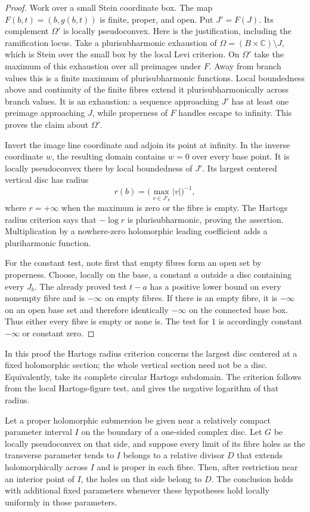 \begin{proof}
Work over a small Stein coordinate box. The map
$F(b,t)=(b,g(b,t))$ is finite, proper, and open. Put $J'=F(J)$.
Its complement $\Omega'$ is locally pseudoconvex. Here is the
justification, including the ramification locus. Take a
plurisubharmonic exhaustion of
$\Omega=(B\times\mathbb C)\setminus J$, which is Stein over the
small box by the local Levi criterion. On $\Omega'$ take the maximum
of this exhaustion over all preimages under $F$. Away from branch
values this is a finite maximum of plurisubharmonic functions.
Local boundedness above and continuity of the finite fibres extend
it plurisubharmonically across branch values. It is an exhaustion:
a sequence approaching $J'$ has at least one preimage approaching
$J$, while properness of $F$ handles escape to infinity. This proves
the claim about $\Omega'$.

Invert the image line coordinate and adjoin its point at infinity.
In the inverse coordinate $w$, the resulting domain contains
$w=0$ over every base point. It is locally pseudoconvex there by
local boundedness of $J'$. Its largest centered vertical disc has
radius
\[
 r(b)=\bigl(\max_{v\in J'_b}|v|\bigr)^{-1},
\]
where $r=+\infty$ when the maximum is zero or the fibre is empty.
The Hartogs radius criterion says that $-\log r$ is
plurisubharmonic, proving the assertion. Multiplication by a
nowhere-zero holomorphic leading coefficient adds a pluriharmonic
function.

For the constant test, note first that empty fibres form an open
set by properness. Choose, locally on the base, a constant $a$ outside
a disc containing every $J_b$. The already proved test $t-a$ has
a positive lower bound on every nonempty fibre and is $-\infty$
on empty fibres. If there is an empty fibre, it is $-\infty$ on an
open base set and therefore identically $-\infty$ on the connected
base box. Thus either every fibre is empty or none is. The test
for $1$ is accordingly constant $-\infty$ or constant zero.
\end{proof}

In this proof the Hartogs radius criterion concerns the largest
disc centered at a fixed holomorphic section; the whole vertical
section need not be a disc. Equivalently, take its complete circular
Hartogs subdomain. The criterion follows from the local
Hartogs-figure test, and gives the negative logarithm of that radius.

\begin{lemma}\label{holes:boundary-trapping}
Let a proper holomorphic submersion be given near a relatively compact
parameter interval $I$ on the boundary of a one-sided complex disc.
Let $G$ be locally pseudoconvex on that side, and suppose every
limit of its fibre holes as the transverse parameter tends to $I$
belongs to a relative divisor $D$ that extends holomorphically
across $I$ and is proper in each fibre. Then, after restriction near
an interior point of $I$, the holes on that side belong to $D$.
The conclusion holds with additional fixed parameters whenever
these hypotheses hold locally uniformly in those parameters.
\end{lemma}

